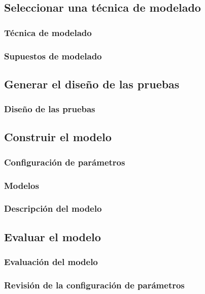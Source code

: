 \subsection{Seleccionar una técnica de modelado}
    \subsubsection{Técnica de modelado}
    \subsubsection{Supuestos de modelado}
\subsection{Generar el diseño de las pruebas}
    \subsubsection{Diseño de las pruebas}
\subsection{Construir el modelo}
    \subsubsection{Configuración de parámetros}
    \subsubsection{Modelos}
    \subsubsection{Descripción del modelo}
\subsection{Evaluar el modelo}
    \subsubsection{Evaluación del modelo}
    \subsubsection{Revisión de la configuración de parámetros}